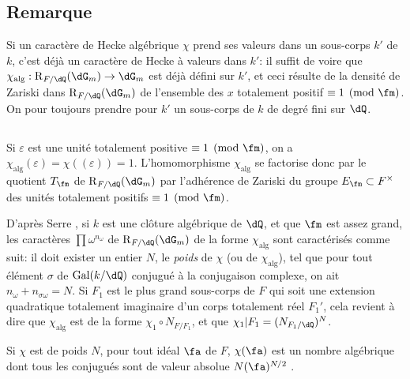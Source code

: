\subsection{Remarque}\label{VI:5-4}

Si un caractère de Hecke algébrique $\chi$ prend ses valeurs dans un 
sous-corps $k'$ de $k$, c'est déjà un caractère de Hecke à valeurs dans 
$k'$: il suffit de voire que $\chi_\text{alg}:\res_{F/\dQ}(\dG_m) \to \dG_m$ 
est déjà défini sur $k'$, et ceci résulte de la densité de Zariski 
dans $\res_{F/\dQ}(\dG_m)$ de l'ensemble des $x$ totalement positif 
$\equiv 1\pmod\fm$. On pour toujours prendre pour $k'$ un sous-corps de $k$ de 
degré fini sur $\dQ$. 





\subsection{}\label{VI:5-5}

Si $\varepsilon$ est une unité totalement positive $\equiv 1\pmod\fm$, on a 
$\chi_\text{alg}(\varepsilon) = \chi((\varepsilon)) = 1$. L'homomorphisme 
$\chi_\text{alg}$ se factorise donc par le quotient $T_\fm$ de 
$\res_{F/\dQ}(\dG_m)$ par l'adhérence de Zariski du groupe 
$E_\fm\subset F^\times$ des unités totalement positifs $\equiv 1\pmod\fm$. 

D'après Serre \cite[II.3]{se68}, si $k$ est une clôture algébrique de 
$\dQ$, et que $\fm$ est assez grand, les caractères $\prod \omega^{n_\omega}$ 
de $\res_{F/\dQ}(\dG_m)$ de la forme $\chi_\text{alg}$ sont caractérisés 
comme suit: il doit exister un entier $N$, le \emph{poids} de $\chi$ (ou de 
$\chi_\text{alg}$), tel que pour tout élément $\sigma$ de $\gal(k/\dQ)$ 
conjugué à la conjugaison complexe, on ait $n_\omega+n_{\sigma \omega}=N$. Si 
$F_1$ est le plus grand sous-corps de $F$ qui soit une extension quadratique 
totalement imaginaire d'un corps totalement réel $F_1'$, cela revient à 
dire que $\chi_\text{alg}$ est de la forme $\chi_1\circ N_{F/F_1}$, et que 
$\chi_1|F_1=(N_{F_1/\dQ})^N$. 

Si $\chi$ est de poids $N$, pour tout idéal $\fa$ de $F$, $\chi(\fa)$ est un 
nombre algébrique dont tous les conjugués sont de valeur absolue 
$N(\fa)^{N/2}$ \cite[II.3 prop.2]{se68}. 





\subsection{}\label{VI:5-6}

